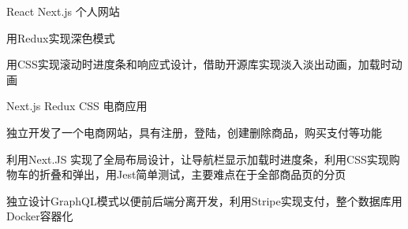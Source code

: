 

\begin{cventries}

  \cventry
    {React Next.js} %
    {个人网站} %
    {} %
    {} %
    {
      \begin{cvitems} %
        \item {用Redux实现深色模式}
        \item {用CSS实现滚动时进度条和响应式设计，借助开源库实现淡入淡出动画，加载时动画}
      \end{cvitems}
    }

\end{cventries}

\begin{cventries}

    \cventry
      {Next.js Redux CSS} %
      {电商应用} %
      {} %
      {} %
      {
        \begin{cvitems} %
          \item {独立开发了一个电商网站，具有注册，登陆，创建删除商品，购买支付等功能}
          \item {利用Next.JS 实现了全局布局设计，让导航栏显示加载时进度条，利用CSS实现购物车的折叠和弹出，用Jest简单测试，主要难点在于全部商品页的分页}
          \item {独立设计GraphQL模式以便前后端分离开发，利用Stripe实现支付，整个数据库用Docker容器化}
        \end{cvitems}
      }
  
  \end{cventries}
